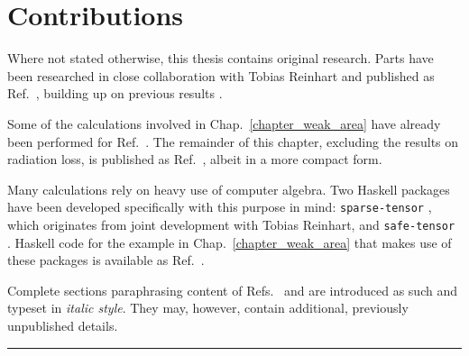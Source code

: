 \chapter{Contributions}

Where not stated otherwise, this thesis contains original research. Parts have been researched in close collaboration with Tobias Reinhart and published as Ref.\ \cite{Alex_2020}, building up on previous results \cite{Reinhart_2018}.

Some of the calculations involved in Chap.~\ref{chapter_weak_area} have already been performed for Ref.\ \cite{Alex_2019}. The remainder of this chapter, excluding the results on radiation loss, is published as Ref.\ \cite{Alex_2020_2}, albeit in a more compact form.

Many calculations rely on heavy use of computer algebra. Two Haskell packages have been developed specifically with this purpose in mind: \texttt{sparse-tensor} \cite{Reinhart_2019_sparse-tensor}, which originates from joint development with Tobias Reinhart, and \texttt{safe-tensor} \cite{Alex_2020_safe-tensor}. Haskell code for the example in Chap.~\ref{chapter_weak_area} that makes use of these packages is available as Ref.\ \cite{Alex_2020_area-metric-gravity}.

Complete sections paraphrasing content of Refs.~\cite{Alex_2020} and \cite{Alex_2020_2} are introduced as such and typeset in \textit{italic style}. They may, however, contain additional, previously unpublished details.

\noindent\rule{\textwidth}{0.4pt}

\cite{Alex_2020}~

\cite{Reinhart_2018}~

\cite{Alex_2019}~

\cite{Alex_2020_2}~

\cite{Reinhart_2019_sparse-tensor}~

\cite{Alex_2020_safe-tensor}~

\cite{Alex_2020_area-metric-gravity}~

